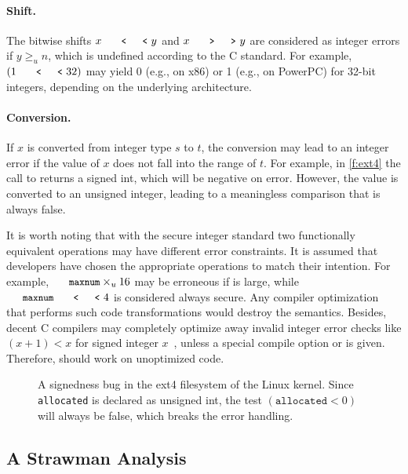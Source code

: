 \paragraph{Shift.}
The bitwise shifts $x \shl y$ and $x \shr y$ are considered as
integer errors if $y \geq_u n$, which is undefined according to the
C standard.  For example, $(1 \shl 32)$ may yield 0 (e.g., on x86)
or 1 (e.g., on PowerPC) for 32-bit integers, depending on the
underlying architecture.

\paragraph{Conversion.}
If $x$ is converted from integer type $s$ to $t$, the conversion
may lead to an integer error if the value of $x$ does not fall into
the range of $t$.  For example, in \autoref{f:ext4} the call to
 returns a signed int, which will be negative
on error.  However, the value is converted to an unsigned integer,
leading to a meaningless comparison that is always false.

\paraend

It is worth noting that with the secure integer standard two
functionally equivalent operations may have different error constraints.
It is assumed that developers have chosen the appropriate operations
to match their intention.  For example, $\cc{maxnum}\times_u 16$
may be erroneous if  is large, while $\cc{maxnum} \shl
4$ is considered always secure.  Any compiler optimization that
performs such code transformations would destroy the semantics.
Besides, decent C compilers may completely optimize away invalid
integer error checks like $(x + 1) < x$ for signed integer
$x$~\cite{gcc:signed-overflow,us-cert:gcc}, unless a special compile
option  or  is given.  Therefore,
\sys should work on unoptimized code.

\begin{figure}
\centering

\caption{A signedness bug in the ext4 filesystem of the Linux kernel.
Since \texttt{allocated} is declared as unsigned int, the test
$(\texttt{allocated} < 0)$ will always be false, which breaks the
error handling.}
\label{f:ext4}
\end{figure}

\subsection{A Strawman Analysis}

